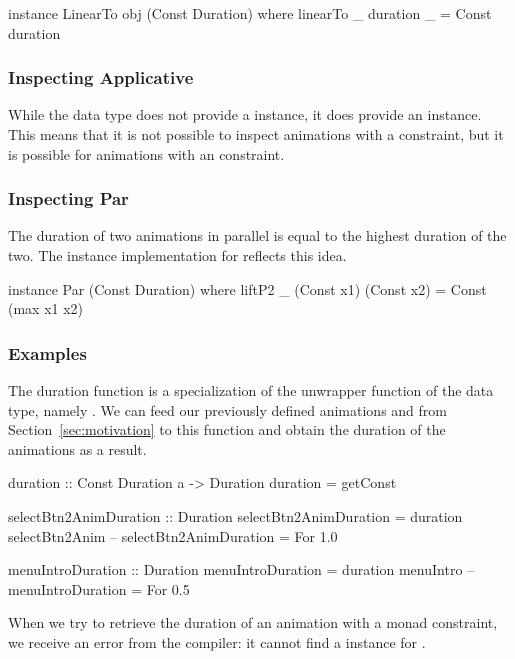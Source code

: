 \begin{code}
instance LinearTo obj (Const Duration) where
  linearTo _ duration _ = Const duration
\end{code}

\subsubsection{Inspecting Applicative}

While the  data type does not provide a  instance, it does provide an  instance. This means that it is not possible to inspect animations with a  constraint, but it is possible for animations with an  constraint.

\subsubsection{Inspecting Par}

The duration of two animations in parallel is equal to the highest duration of the two. The  instance implementation for  reflects this idea. 

\begin{code}
instance Par (Const Duration) where
  liftP2 _ (Const x1) (Const x2) = Const (max x1 x2)
\end{code}

\subsubsection{Examples}

The duration function is a specialization of the unwrapper function of the  data type, namely . We can feed our previously defined animations  and  from Section~\ref{sec:motivation} to this function and obtain the duration of the animations as a result.

\begin{code}
duration :: Const Duration a -> Duration
duration = getConst

selectBtn2AnimDuration :: Duration
selectBtn2AnimDuration = duration selectBtn2Anim
-- selectBtn2AnimDuration = For 1.0

menuIntroDuration :: Duration
menuIntroDuration = duration menuIntro
-- menuIntroDuration = For 0.5
\end{code}

When we try to retrieve the duration of an animation with a monad constraint, we receive an error from the compiler: it cannot find a  instance for .

